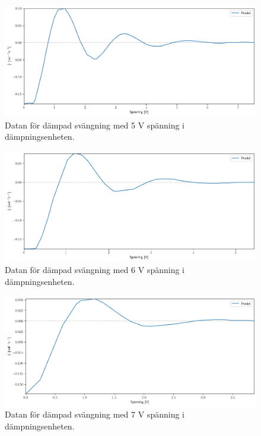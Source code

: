 \documentclass[12pt, a4paper]{article}
\begin{document}
\begin{figure}[hp]
    \includegraphics[width=\textwidth]{graf_5_v_centered}
    \caption{Datan för dämpad svängning med 5 V spänning i dämpningsenheten.}
    \label{fig:data_5_v}
\end{figure}

\begin{figure}[hp]
    \includegraphics[width=\textwidth]{graf_6_v_centered}
    \caption{Datan för dämpad svängning med 6 V spänning i dämpningsenheten.}
    \label{fig:data_6_v}
\end{figure}

\begin{figure}[hp]
    \includegraphics[width=\textwidth]{graf_7_v_centered}
    \caption{Datan för dämpad svängning med 7 V spänning i dämpningsenheten.}
    \label{fig:data_7_v}
\end{figure}
\end{document}
